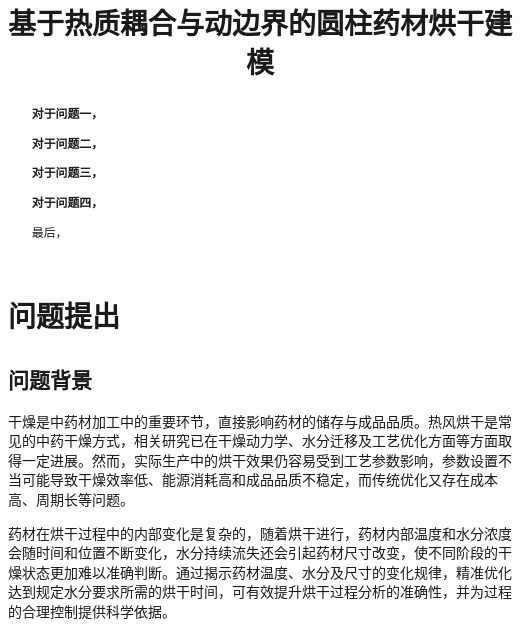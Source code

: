 \documentclass[withoutpreface,bwprint]{cumcmthesis}
\title{基于热质耦合与动边界的圆柱药材烘干建模}  %
\begin{document}
	
\maketitle
\begin{abstract}


\textbf{对于问题一，}

\textbf{对于问题二，}

\textbf{对于问题三，}

\textbf{对于问题四，}

最后，




\end{abstract}













\vspace{-1.4cm} 
\section{问题提出}
\subsection{问题背景}
干燥是中药材加工中的重要环节，直接影响药材的储存与成品品质。热风烘干是常见的中药干燥方式，相关研究已在干燥动力学、水分迁移及工艺优化方面等方面取得一定进展。然而，实际生产中的烘干效果仍容易受到工艺参数影响，参数设置不当可能导致干燥效率低、能源消耗高和成品品质不稳定，而传统优化又存在成本高、周期长等问题。

药材在烘干过程中的内部变化是复杂的，随着烘干进行，药材内部温度和水分浓度会随时间和位置不断变化，水分持续流失还会引起药材尺寸改变，使不同阶段的干燥状态更加难以准确判断。通过揭示药材温度、水分及尺寸的变化规律，精准优化达到规定水分要求所需的烘干时间，可有效提升烘干过程分析的准确性，并为过程的合理控制提供科学依据。
\end{document}
